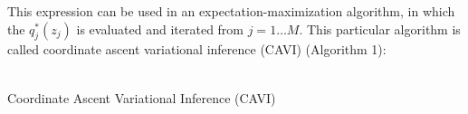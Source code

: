 \documentclass[a4paper,12pt]{article}
\begin{document}
This expression can be used in an expectation-maximization algorithm, in which the $q^*_j(z_j)$ is evaluated and iterated from $j=1\dots M$. This particular algorithm is called coordinate ascent variational inference (CAVI) (Algorithm 1):\\
\\
\begin{algorithm}[H]
\caption{Coordinate Ascent Variational Inference (CAVI)}
\BlankLine
{}
\end{algorithm}
\end{document}
